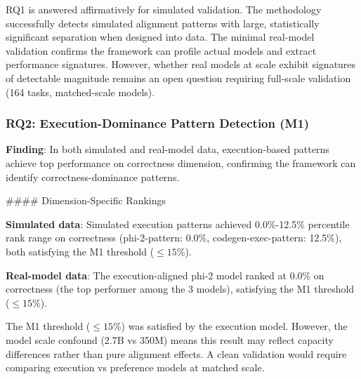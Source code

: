 RQ1 is answered affirmatively for simulated validation. The methodology successfully detects simulated alignment patterns with large, statistically significant separation when designed into data. The minimal real-model validation confirms the framework can profile actual models and extract performance signatures. However, whether real models at scale exhibit signatures of detectable magnitude remains an open question requiring full-scale validation (164 tasks, matched-scale models).

\subsubsection{RQ2: Execution-Dominance Pattern Detection (M1)}

\textbf{Finding}: In both simulated and real-model data, execution-based patterns achieve top performance on correctness dimension, confirming the framework can identify correctness-dominance patterns.

\#\#\#\# Dimension-Specific Rankings

\textbf{Simulated data}: Simulated execution patterns achieved 0.0\%-12.5\% percentile rank range on correctness (phi-2-pattern: 0.0\%, codegen-exec-pattern: 12.5\%), both satisfying the M1 threshold ($\leq 15$\%).

\textbf{Real-model data}: The execution-aligned phi-2 model ranked at 0.0\% on correctness (the top performer among the 3 models), satisfying the M1 threshold ($\leq 15$\%).

\begin{table}[htbp]
\centering
{}
\end{table}

The M1 threshold ($\leq 15$\%) was satisfied by the execution model. However, the model scale confound (2.7B vs 350M) means this result may reflect capacity differences rather than pure alignment effects. A clean validation would require comparing execution vs preference models at matched scale.

